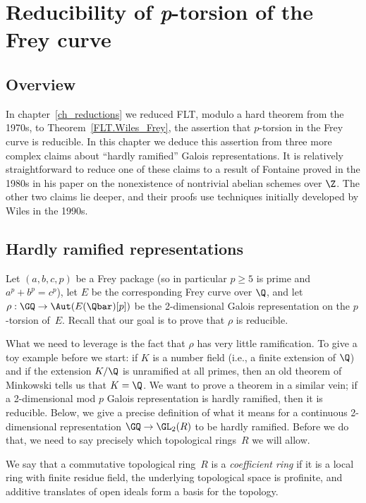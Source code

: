 \chapter{Reducibility of {\it p}-torsion of the Frey curve}\label{ch_freyreduction}

\section{Overview}

In chapter~\ref{ch_reductions} we reduced FLT, modulo a hard theorem from the 1970s,
to Theorem~\ref{FLT.Wiles_Frey}, the assertion that $p$-torsion in the Frey
curve is reducible. In this chapter we deduce this assertion from three more complex claims
about ``hardly ramified'' Galois representations. It is relatively straightforward
to reduce one of these claims to a result of Fontaine proved in the 1980s in his
paper on the nonexistence of nontrivial abelian schemes over $\Z$. The other two
claims lie deeper, and their proofs use techniques initially developed by Wiles in
the 1990s.

\section{Hardly ramified representations}

Let $(a,b,c,p)$ be a Frey package (so in particular $p\geq5$ is prime and $a^p+b^p=c^p$),
let $E$ be the corresponding Frey curve over $\Q$, and let $\rho:\GQ\to\Aut(E(\Qbar)[p])$
be the 2-dimensional Galois representation on the $p$-torsion of~$E$. Recall that our goal
is to prove that $\rho$ is reducible.

What we need to leverage is the fact that $\rho$ has very little ramification. To give
a toy example before we start: if $K$ is a number field (i.e., a finite extension of $\Q$)
and if the extension $K/\Q$ is unramified at all primes, then an old theorem of
Minkowski tells us that $K=\Q$. We want to prove a theorem in a similar vein; if
a 2-dimensional mod $p$ Galois representation is hardly ramified, then it is reducible.
Below, we give a precise
definition of what it means for a continuous 2-dimensional representation $\GQ\to\GL_2(R)$
to be hardly ramified. Before we do that, we need to say precisely which topological rings~$R$
we will allow.

\begin{definition}
  \label{coefficient-ring}
  We say that a commutative topological ring~$R$ is a \emph{coefficient ring} if it
  is a local ring with finite residue field, the underlying topological space is
  profinite, and additive translates of open ideals form a basis for the topology.
\end{definition}

